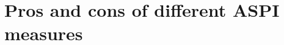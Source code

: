\documentclass{article}
\newtheorem{definition}[theorem]{Definition}
\newtheorem{remark}[theorem]{Remark}
\begin{document}



\section{Pros and cons of different ASPI measures}
\label{prosandconssection}
\end{document}
